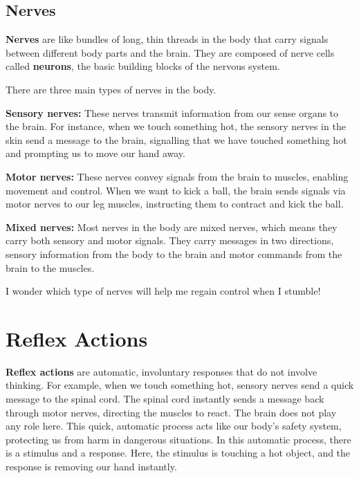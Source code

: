 \subsection{Nerves}
\textbf{Nerves} are like bundles of long, thin threads in the body that carry signals between different body parts and the brain. They are composed of nerve cells called \textbf{neurons}, the basic building blocks of the nervous system.
\vspace{0.1in}
\par
There are three main types of nerves in the body.
\par
\textbf{Sensory nerves:} These nerves transmit information from our sense organs to the brain. For instance, when we touch something hot, the sensory nerves in the skin send a message to the brain, signalling that we have touched something hot and prompting us to move our hand away.
\vspace{0.1in}
\par
\textbf{Motor nerves:} These nerves convey signals from the brain to muscles, enabling movement and control. When we want to kick a ball, the brain sends signals via motor nerves to our leg muscles, instructing them to contract and kick the ball.
\vspace{0.1in}
\par
\textbf{Mixed nerves:} Most nerves in the body are mixed nerves, which means they carry both sensory and motor signals. They carry messages in two directions, sensory information from the body to the brain and motor commands from the brain to the muscles.
\vspace{0.3in}
\par
I wonder which type of nerves will help me regain control when I stumble!
\section{Reflex Actions}
\textbf{Reflex actions} are automatic, involuntary responses that do not involve thinking. For example, when we touch something hot, sensory nerves send a quick message to the spinal cord. The spinal cord instantly sends a message back through motor nerves, directing the muscles to react. The brain does not play any role here. This quick, automatic process acts like our body's safety system, protecting us from harm in dangerous situations. In this automatic process, there is a stimulus and a response. Here, the stimulus is touching a hot object, and the response is removing our hand instantly.
\vspace{2.0in}
